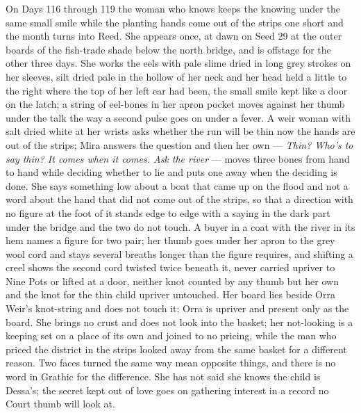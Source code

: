 \documentclass{design/chronicle}
\begin{document}
{On Days 116 through 119 the woman who knows keeps the knowing under the same small smile while the planting hands come out of the strips one short and the month turns into Reed. She appears once, at dawn on Seed 29 at the outer boards of the fish-trade shade below the north bridge, and is offstage for the other three days. She works the eels with pale slime dried in long grey strokes on her sleeves, silt dried pale in the hollow of her neck and her head held a little to the right where the top of her left ear had been, the small smile kept like a door on the latch; a string of eel-bones in her apron pocket moves against her thumb under the talk the way a second pulse goes on under a fever. A weir woman with salt dried white at her wrists asks whether the run will be thin now the hands are out of the strips; Mira answers the question and then her own — \emph{Thin? Who’s to say thin? It comes when it comes. Ask the river} — moves three bones from hand to hand while deciding whether to lie and puts one away when the deciding is done. She says something low about a boat that came up on the flood and not a word about the hand that did not come out of the strips, so that a direction with no figure at the foot of it stands edge to edge with a saying in the dark part under the bridge and the two do not touch. A buyer in a coat with the river in its hem names a figure for two pair; her thumb goes under her apron to the grey wool cord and stays several breaths longer than the figure requires, and shifting a creel shows the second cord twisted twice beneath it, never carried upriver to Nine Pots or lifted at a door, neither knot counted by any thumb but her own and the knot for the thin child upriver untouched. Her board lies beside Orra Weir’s knot-string and does not touch it; Orra is upriver and present only as the board. She brings no crust and does not look into the basket; her not-looking is a keeping set on a place of its own and joined to no pricing, while the man who priced the district in the strips looked away from the same basket for a different reason. Two faces turned the same way mean opposite things, and there is no word in Grathic for the difference. She has not said she knows the child is Dessa’s; the secret kept out of love goes on gathering interest in a record no Court thumb will look at.

}
\end{document}
